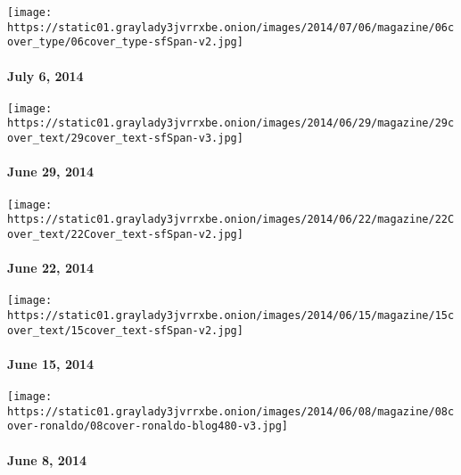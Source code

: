 \href{http://www.nytimes3xbfgragh.onion/indexes/2014/07/06/magazine/index.html}{}

\texttt{[image: https://static01.graylady3jvrrxbe.onion/images/2014/07/06/magazine/06cover\_type/06cover\_type-sfSpan-v2.jpg]}

\hypertarget{july-6-2014}{%
\paragraph{July 6, 2014}\label{july-6-2014}}

\href{http://www.nytimes3xbfgragh.onion/indexes/2014/06/29/magazine/index.html}{}

\texttt{[image: https://static01.graylady3jvrrxbe.onion/images/2014/06/29/magazine/29cover\_text/29cover\_text-sfSpan-v3.jpg]}

\hypertarget{june-29-2014}{%
\paragraph{June 29, 2014}\label{june-29-2014}}

\href{http://www.nytimes3xbfgragh.onion/indexes/2014/06/22/magazine/index.html}{}

\texttt{[image: https://static01.graylady3jvrrxbe.onion/images/2014/06/22/magazine/22Cover\_text/22Cover\_text-sfSpan-v2.jpg]}

\hypertarget{june-22-2014}{%
\paragraph{June 22, 2014}\label{june-22-2014}}

\href{http://www.nytimes3xbfgragh.onion/indexes/2014/06/15/magazine/index.html}{}

\texttt{[image: https://static01.graylady3jvrrxbe.onion/images/2014/06/15/magazine/15cover\_text/15cover\_text-sfSpan-v2.jpg]}

\hypertarget{june-15-2014}{%
\paragraph{June 15, 2014}\label{june-15-2014}}

\href{http://www.nytimes3xbfgragh.onion/indexes/2014/06/08/magazine/index.html}{}

\texttt{[image: https://static01.graylady3jvrrxbe.onion/images/2014/06/08/magazine/08cover-ronaldo/08cover-ronaldo-blog480-v3.jpg]}

\hypertarget{june-8-2014}{%
\paragraph{June 8, 2014}\label{june-8-2014}}

